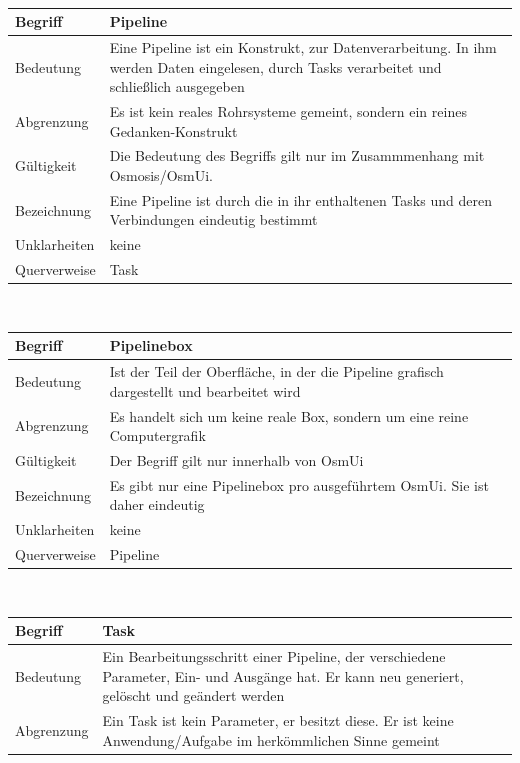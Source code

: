 \documentclass[a4paper,12pt]{scrartcl}
\begin{document}
\begin{center}
\vspace{0.7cm}
\\
\begin{tabular}{|p{5cm}|p{10cm}|}
\hline Begriff & \textbf{Pipeline} \\ 
\hline Bedeutung & Eine Pipeline ist ein Konstrukt, zur Datenverarbeitung. In ihm werden Daten eingelesen, durch Tasks verarbeitet und schließlich ausgegeben\\ 
\hline Abgrenzung & Es ist kein reales Rohrsysteme gemeint, sondern ein reines Gedanken-Konstrukt \\ 
\hline Gültigkeit & Die Bedeutung des Begriffs gilt nur im Zusammmenhang mit Osmosis/OsmUi. \\ 
\hline Bezeichnung & Eine Pipeline ist durch die in ihr enthaltenen Tasks und deren Verbindungen eindeutig bestimmt \\ 
\hline Unklarheiten & keine \\ 
\hline Querverweise & Task \\ 
\hline 
\end{tabular}
\vspace{0.7cm}
\\
\begin{tabular}{|p{5cm}|p{10cm}|}
\hline Begriff & \textbf{Pipelinebox} \\ 
\hline Bedeutung & Ist der Teil der Oberfläche, in der die Pipeline grafisch dargestellt und bearbeitet wird \\ 
\hline Abgrenzung & Es handelt sich um keine reale Box, sondern um eine reine Computergrafik \\ 
\hline Gültigkeit & Der Begriff gilt nur innerhalb von OsmUi \\ 
\hline Bezeichnung & Es gibt nur eine Pipelinebox pro ausgeführtem OsmUi. Sie ist daher eindeutig \\ 
\hline Unklarheiten & keine \\ 
\hline Querverweise & Pipeline \\ 
\hline 
\end{tabular}
\vspace{0.7cm}
\\
\begin{tabular}{|p{5cm}|p{10cm}|}
\hline Begriff & \textbf{Task} \\ 
\hline Bedeutung & Ein Bearbeitungsschritt einer Pipeline, der verschiedene Parameter, Ein- und Ausgänge hat. Er kann neu generiert, gelöscht und geändert werden\\ 
\hline Abgrenzung & Ein Task ist kein Parameter, er besitzt diese. Er ist keine Anwendung/Aufgabe im herkömmlichen Sinne gemeint\\ 

\end{tabular}
\end{center}
\end{document}
